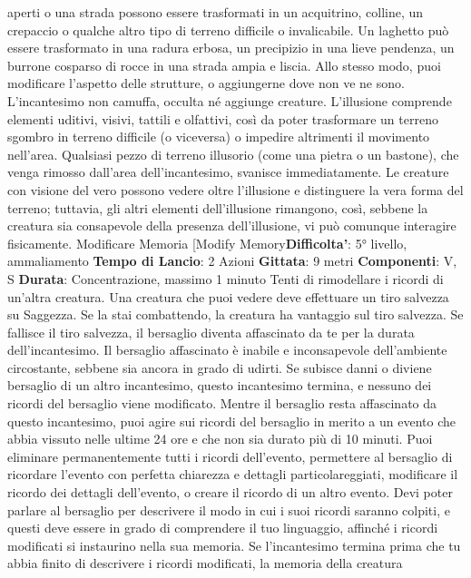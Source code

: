 \begin{multicols}{2}
aperti o una strada possono essere trasformati in un
acquitrino, colline, un crepaccio o qualche altro tipo di
terreno difficile o invalicabile. Un laghetto può essere
trasformato in una radura erbosa, un precipizio in una
lieve pendenza, un burrone cosparso di rocce in una
strada ampia e liscia.
Allo stesso modo, puoi modificare l’aspetto delle
strutture, o aggiungerne dove non ve ne sono.
L’incantesimo non camuffa, occulta né aggiunge
creature.
L’illusione comprende elementi uditivi, visivi, tattili e
olfattivi, così da poter trasformare un terreno sgombro
in terreno difficile (o viceversa) o impedire altrimenti il
movimento nell’area. Qualsiasi pezzo di terreno illusorio
(come una pietra o un bastone), che venga rimosso
dall’area dell’incantesimo, svanisce immediatamente.
Le creature con visione del vero possono vedere oltre
l’illusione e distinguere la vera forma del terreno;
tuttavia, gli altri elementi dell’illusione rimangono, così,
sebbene la creatura sia consapevole della presenza
dell’illusione, vi può comunque interagire fisicamente.
Modificare Memoria
[Modify Memory\textbf{Difficolta'}:
5° livello, ammaliamento
\textbf{Tempo di Lancio}: 2 Azioni
\textbf{Gittata}: 9 metri
\textbf{Componenti}: V, S
\textbf{Durata}: Concentrazione, massimo 1 minuto
Tenti di rimodellare i ricordi di un’altra creatura. Una
creatura che puoi vedere deve effettuare un tiro
salvezza su Saggezza. Se la stai combattendo, la
creatura ha vantaggio sul tiro salvezza. Se fallisce il tiro
salvezza, il bersaglio diventa affascinato da te per la
durata dell’incantesimo. Il bersaglio affascinato è inabile
e inconsapevole dell’ambiente circostante, sebbene sia
ancora in grado di udirti. Se subisce danni o diviene
bersaglio di un altro incantesimo, questo incantesimo 
termina, e nessuno dei ricordi del bersaglio viene
modificato.
Mentre il bersaglio resta affascinato da questo
incantesimo, puoi agire sui ricordi del bersaglio in
merito a un evento che abbia vissuto nelle ultime 24 ore
e che non sia durato più di 10 minuti. Puoi eliminare
permanentemente tutti i ricordi dell’evento, permettere
al bersaglio di ricordare l’evento con perfetta chiarezza
e dettagli particolareggiati, modificare il ricordo dei
dettagli dell’evento, o creare il ricordo di un altro evento.
Devi poter parlare al bersaglio per descrivere il modo in
cui i suoi ricordi saranno colpiti, e questi deve essere in
grado di comprendere il tuo linguaggio, affinché i ricordi
modificati si instaurino nella sua memoria. Se
l’incantesimo termina prima che tu abbia finito di
descrivere i ricordi modificati, la memoria della creatura

\end{multicols}
